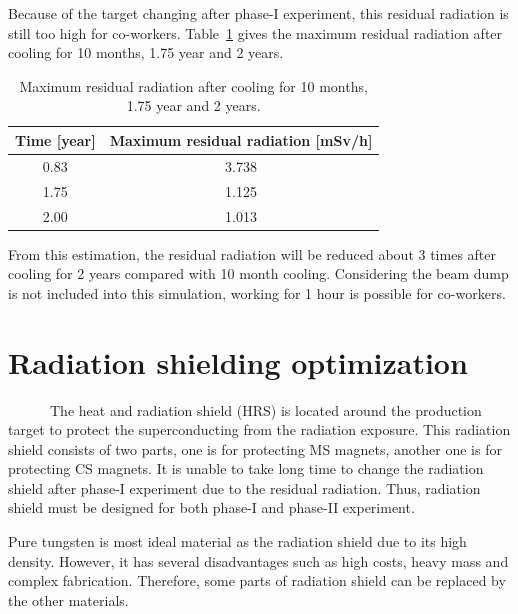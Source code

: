 Because of the target changing after phase-I experiment, this residual radiation is still too high for co-workers.
Table~\ref{2time} gives the maximum residual radiation after cooling for 10 months, 1.75 year and 2 years.
\begin{table}[H]
 \centering
 \begin{tabular}{cc} \hline \hline
  Time [year] & Maximum residual radiation [mSv/h] \\ \hline
  0.83 & 3.738 \\
  1.75 & 1.125 \\
  2.00 & 1.013 \\ \hline \hline
 \end{tabular}
 \caption{Maximum residual radiation after cooling for 10 months, 1.75 year and 2 years.}
 \label{2time}
\end{table}
From this estimation, the residual radiation will be reduced about 3 times after cooling for 2 years compared with 10 month cooling.
Considering the beam dump is not included into this simulation, working for 1 hour is possible for co-workers.

 \section{Radiation shielding optimization}
~~~~~~The heat and radiation shield (HRS) is located around the production target to protect the superconducting from the radiation exposure.
This radiation shield consists of two parts, one is for protecting MS magnets, another one is for protecting CS magnets.
It is unable to take long time to change the radiation shield after phase-I experiment due to the residual radiation.
Thus, radiation shield must be designed for both phase-I and phase-II experiment.

Pure tungsten is most ideal material as the radiation shield due to its high density.
However, it has several disadvantages such as high costs, heavy mass and complex fabrication.
Therefore, some parts of radiation shield can be replaced by the other materials.

